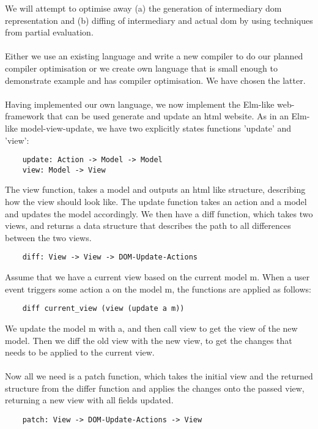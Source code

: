 We will attempt to optimise away (a) the generation of intermediary \gls{dom} representation and (b) diffing of intermediary and actual \gls{dom} by using techniques from partial evaluation.
\\\\
Either we use an existing language and write a new compiler to do our planned compiler optimisation or we create own language that is small enough to demonstrate example and has compiler optimisation. We have chosen the latter. 
\\\\
Having implemented our own language, we now implement the Elm-like web-framework that can be used generate and update an \gls{html} website. As in an Elm-like model-view-update, we have two explicitly states functions 'update' and 'view':

\begin{verbatim}
    update: Action -> Model -> Model
    view: Model -> View 
\end{verbatim}

The view function, takes a model and outputs an \gls{html} like structure, describing how the view should look like. The update function takes an action and a model and updates the model accordingly. We then have a diff function, which takes two views, and returns a data structure that describes the path to all differences between the two views.

\begin{verbatim}
    diff: View -> View -> DOM-Update-Actions
\end{verbatim}

Assume that we have a current view based on the current model m. When a user event triggers some action a on the model m, the functions are applied as follows:

\begin{verbatim}
    diff current_view (view (update a m))
\end{verbatim}

We update the model m with a, and then call view to get the view of the new model. Then we diff the old view with the new view, to get the changes that needs to be applied to the current view. 
\\\\
Now all we need is a patch function, which takes the initial view and the returned structure from the differ function and applies the changes onto the passed view, returning a new view with all fields updated.

\begin{verbatim}
    patch: View -> DOM-Update-Actions -> View
\end{verbatim}

